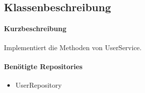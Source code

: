 \subsection*{Klassenbeschreibung}%
\paragraph*{Kurzbeschreibung}
Implementiert die Methoden von UserService.
\paragraph*{Benötigte Repositories}
\begin{itemize}
    \item UserRepository
\end{itemize}
